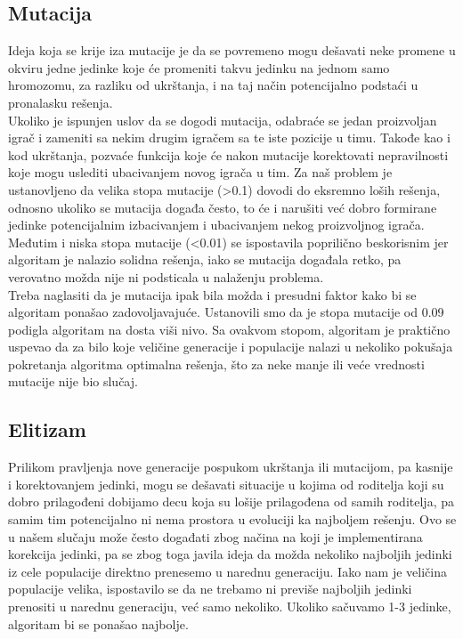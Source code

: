 \documentclass[a4paper]{article}
\begin{document}
\subsection{Mutacija}
Ideja koja se krije iza mutacije je da se povremeno mogu dešavati neke promene u okviru jedne jedinke koje će promeniti takvu jedinku na jednom samo hromozomu, za razliku od ukrštanja, i na taj način potencijalno podstaći u pronalasku rešenja. \\
Ukoliko je ispunjen uslov da se dogodi mutacija, odabraće se jedan proizvoljan igrač i zameniti sa nekim drugim igračem sa te iste pozicije u timu. Takođe kao i kod ukrštanja, pozvaće funkcija koje će nakon mutacije korektovati nepravilnosti koje mogu uslediti ubacivanjem novog igrača u tim.
Za naš problem je ustanovljeno da velika stopa mutacije (>0.1) dovodi do eksremno loših rešenja, odnosno ukoliko se mutacija događa često, to će i narušiti već dobro formirane jedinke potencijalnim izbacivanjem i ubacivanjem nekog proizvoljnog igrača. \\
Međutim i niska stopa mutacije (<0.01) se ispostavila poprilično beskorisnim jer algoritam je nalazio solidna rešenja, iako se mutacija događala retko, pa verovatno možda nije ni podsticala u nalaženju problema. \\
Treba naglasiti da je mutacija ipak bila možda i presudni faktor kako bi se algoritam ponašao zadovoljavajuće. Ustanovili smo da je stopa mutacije od 0.09 podigla algoritam na dosta viši nivo. Sa ovakvom stopom, algoritam je praktično uspevao da za bilo koje veličine generacije i populacije nalazi u nekoliko pokušaja pokretanja algoritma optimalna rešenja, što za neke manje ili veće vrednosti mutacije nije bio slučaj.

\subsection{Elitizam}
Prilikom pravljenja nove generacije pospukom ukrštanja ili mutacijom, pa kasnije i korektovanjem jedinki, mogu se dešavati situacije u kojima od roditelja koji su dobro prilagođeni dobijamo decu koja su lošije prilagođena od samih roditelja, pa samim tim potencijalno ni nema prostora u evoluciji ka najboljem rešenju. Ovo se u našem slučaju može često događati zbog načina na koji je implementirana korekcija jedinki, pa se zbog toga javila ideja da možda nekoliko najboljih jedinki iz cele populacije direktno prenesemo u narednu generaciju. Iako nam je veličina populacije velika, ispostavilo se da ne trebamo ni previše najboljih jedinki prenositi u narednu generaciju, već samo nekoliko. Ukoliko sačuvamo 1-3 jedinke, algoritam bi se ponašao najbolje.
\end{document}
